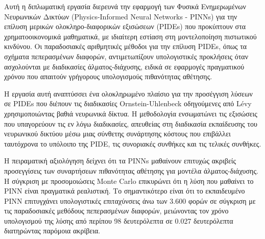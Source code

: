    

\begin{greekabstract}
    Αυτή η διπλωματική εργασία διερευνά την εφαρμογή των Φυσικά Ενημερωμένων Νευρωνικών Δικτύων (Physics-Informed Neural Networks - PINNs) για την επίλυση μερικών ολοκληρο-διαφορικών εξισώσεων (PIDEs) που προκύπτουν στα χρηματοοικονομικά μαθηματικά, με ιδιαίτερη εστίαση στη μοντελοποίηση πιστωτικού κινδύνου. Οι παραδοσιακές αριθμητικές μέθοδοι για την επίλυση PIDEs, όπως τα σχήματα πεπερασμένων διαφορών, αντιμετωπίζουν υπολογιστικές προκλήσεις όταν ασχολούνται με διαδικασίες άλματος-διάχυσης, ειδικά σε εφαρμογές πραγματικού χρόνου που απαιτούν γρήγορους υπολογισμούς πιθανότητας αθέτησης.

    Η εργασία αυτή αναπτύσσει ένα ολοκληρωμένο πλαίσιο για την προσέγγιση λύσεων σε PIDEs που διέπουν τις διαδικασίες Ornstein-Uhlenbeck οδηγούμενες από Lévy χρησιμοποιώντας βαθιά νευρωνικά δίκτυα. Η μεθοδολογία ενσωματώνει τις εξισώσεις που υπαγορεύουν τις εν λόγω διαδικασίες, απευθείας στη διαδικασία εκπαίδευσης του νευρωνικού δικτύου μέσω μιας σύνθετης συνάρτησης κόστους που επιβάλλει ταυτόχρονα το υπόλοιπο της PIDE, τις συνοριακές συνθήκες και τις τελικές συνθήκες.
    
    Η πειραματική αξιολόγηση δείχνει ότι τα PINNs μαθαίνουν επιτυχώς ακριβείς προσεγγίσεις των συναρτήσεων πιθανότητας αθέτησης για μοντέλα άλματος-διάχυσης. Η σύγκριση με προσομοιώσεις Monte Carlo επικυρώνει ότι η λύση που μαθαίνει το PINN είναι πραγματικά ρεαλιστική. Το σημαντικότερο είναι ότι το εκπαιδευμένο PINN επιτυγχάνει υπολογιστικές επιταχύνσεις άνω των 3.600 φορών σε σύγκριση με τις παραδοσιακές μεθόδους πεπερασμένων διαφορών, μειώνοντας τον χρόνο υπολογισμού της λύσης από περίπου 98 δευτερόλεπτα σε 0.027 δευτερόλεπτα διατηρώντας παρόμοια ακρίβεια.
    

\end{greekabstract}
